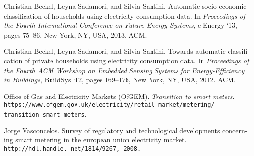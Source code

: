 \documentclass[10pt,a4paper]{report}
\begin{document}
\begin{thebibliography}{9}

 Christian Beckel, Leyna Sadamori, and Silvia Santini. Automatic socio-economic classification of households using electricity consumption data. In {\em Proceedings of the Fourth International Conference on Future Energy Systems}, e-Energy `13, pages 75–86, New York, NY, USA, 2013. ACM.

 Christian Beckel, Leyna Sadamori, and Silvia Santini. Towards automatic classifi- cation of private households using electricity consumption data. In {\em Proceedings of the Fourth ACM Workshop on Embedded Sensing Systems for Energy-Efficiency in Buildings}, BuildSys `12, pages 169–176, New York, NY, USA, 2012. ACM.

 Office of Gas and Electricity Markets (OfGEM). {\em Transition to smart meters}. {\tt https://www.ofgem.gov.uk/electricity/retail-market/metering/ transition-smart-meters}.

 Jorge Vasconcelos. Survey of regulatory and technological developments concern- ing smart metering in the european union electricity market. {\tt http://hdl.handle. net/1814/9267, 2008.}
\end{thebibliography}
\end{document}
